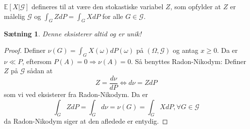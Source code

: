 \documentclass[12pt]{report}
\newtheorem{theorem}[lemma]{Sætning}
\newtheorem{definition}[lemma]{Definition}
\theoremstyle{break}
\newtheorem*{proof}{Bevis}
\theoremstyle{break}
\newcommand{\EE}{\mathbb{E}}
\newcommand{\G}{\mathcal{G}}
\newcommand{\FI}{\mathcal{F}}
\newcommand{\1}{\mathds{1}}
\begin{document}
$\EE\left[ X\vert \G\right]$ defineres til at være den stokastiske variabel $Z$, som opfylder at $Z$ er målelig $\G$ og $\int_G ZdP=\int_G X dP$ for alle $G\in\G$.
\begin{theorem}
	Denne eksisterer altid og er unik!
\end{theorem}
\begin{proof}
	Definer $\nu(G)=\int_G X(\omega)dP(\omega)$ på $(\Omega,\G)$ og antag $x\geq0$. Da er $\nu \ll P$, eftersom $P(A)=0\Rightarrow \nu(A)=0$. Så benyttes Radon-Nikodym: Definer $Z$ på $\G$ sådan at \[ Z=\frac{d\nu}{dP}\iff d\nu =ZdP \] som vi ved eksisterer fra Radon-Nikodym. Da er \[ \int_G Z dP = \int_G d\nu = \nu(G) = \int_G X dP, \forall G\in\G\] da Radon-Nikodym  siger at den afledede er entydig.
\end{proof}
%
%
\newpage
\end{document}
